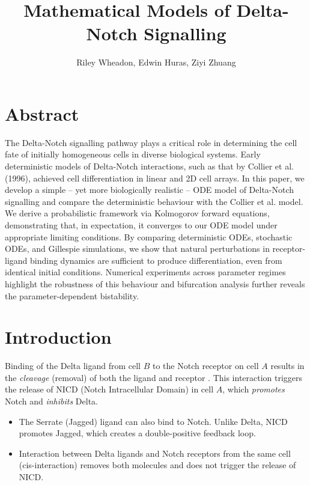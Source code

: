 \documentclass{article}
\title{Mathematical Models of Delta-Notch Signalling}
\author{Riley Wheadon, Edwin Huras, Ziyi Zhuang}
\begin{document}
\maketitle

\begin{flushleft}

\section{Abstract}

The Delta-Notch signalling pathway plays a critical role in determining the cell fate of initially homogeneous cells in diverse biological systems. Early deterministic models of Delta-Notch interactions, such as that by Collier et al. (1996), achieved cell differentiation in linear and 2D cell arrays. In this paper, we develop a simple – yet more biologically realistic – ODE model of Delta-Notch signalling and compare the deterministic behaviour with the Collier et al. model. We derive a probabilistic framework via Kolmogorov forward equations, demonstrating that, in expectation, it converges to our ODE model under appropriate limiting conditions. By comparing deterministic ODEs, stochastic ODEs, and Gillespie simulations, we show that natural perturbations in receptor-ligand binding dynamics are sufficient to produce differentiation, even from identical initial conditions. Numerical experiments across parameter regimes highlight the robustness of this behaviour and bifurcation analysis further reveals the parameter-dependent bistability.

\section{Introduction}

\medskip

Binding of the Delta ligand from cell $B$ to the Notch receptor on cell $A$ results in the \emph{cleavage} (removal) of both the ligand and receptor \cite{collier_pattern_1996}. This interaction triggers the release of NICD (Notch Intracellular Domain) in cell $A$, which \emph{promotes} Notch and \emph{inhibits} Delta.

\begin{itemize}
  \item The Serrate (Jagged) ligand can also bind to Notch. Unlike Delta, NICD promotes Jagged, which creates a double-positive feedback loop.
  \item Interaction between Delta ligands and Notch receptors from the same cell (cis-interaction) removes both molecules and does not trigger the release of NICD.
\end{itemize}


\end{flushleft}
\end{document}
